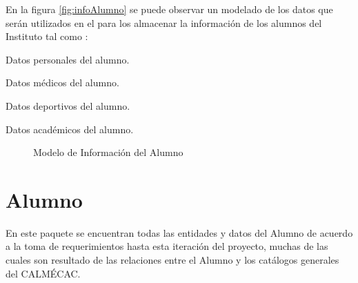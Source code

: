 	En la figura \ref{fig:infoAlumno} se puede observar un modelado de los datos que serán utilizados en el  para los almacenar la información de los alumnos del Instituto tal como :
	\begin{Citemize}
		\item Datos personales del alumno.
		\item Datos médicos del alumno.
		\item Datos deportivos del alumno.
		\item Datos académicos del alumno.
	\end{Citemize}

\begin{figure}[hbtp!]
	\begin{center}
		\caption{Modelo de Información del Alumno}
	\end{center}
\end{figure}

\section{Alumno}

	En este paquete se encuentran todas las entidades y datos del Alumno de acuerdo a la toma de requerimientos hasta esta iteración del proyecto, muchas de las cuales son resultado de las relaciones entre el Alumno y los catálogos generales del CALMÉCAC.

